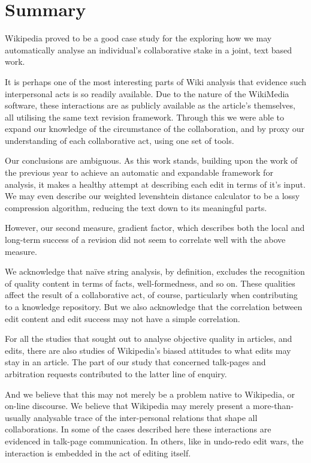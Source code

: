 \section{Summary}
Wikipedia proved to be a good case study for the exploring how we may
automatically analyse an individual's collaborative stake in a joint,
text based work.

It is perhaps one of the most interesting parts of Wiki analysis that
evidence such interpersonal acts is so readily available. Due to the
nature of the WikiMedia software, these interactions are as publicly
available as the article's themselves, all utilising the same text
revision framework. Through this we were able to expand our knowledge
of the circumstance of the collaboration, and by proxy our
understanding of each collaborative act, using one set of tools.

Our conclusions are ambiguous. As this work stands, building upon the
work of the previous year to achieve an automatic and expandable
framework for analysis, it makes a healthy attempt at describing each
edit in terms of it's input. We may even describe our weighted
levenshtein distance calculator to be a lossy compression algorithm,
reducing the text down to its meaningful parts.

However, our second measure, gradient factor, which describes both the
local and long-term success of a revision did not seem to correlate
well with the above measure.

We acknowledge that na\"ive string analysis, by definition, excludes
the recognition of quality content in terms of facts, well-formedness,
and so on. These qualities affect the result of a collaborative act,
of course, particularly when contributing to a knowledge
repository. But we also acknowledge that the correlation between edit
content and edit success may not have a simple correlation.

For all the studies that sought out to analyse objective quality in
articles, and edits, there are also studies of Wikipedia's biased
attitudes to what edits may stay in an article. The part of our study
that concerned talk-pages and arbitration requests contributed to the
latter line of enquiry.

And we believe that this may not merely be a problem native to
Wikipedia, or on-line discourse. We believe that Wikipedia may merely
present a more-than-usually analysable trace of the inter-personal
relations that shape all collaborations. In some of the cases
described here these interactions are evidenced in talk-page
communication. In others, like in undo-redo edit wars, the interaction
is embedded in the act of editing itself. 

